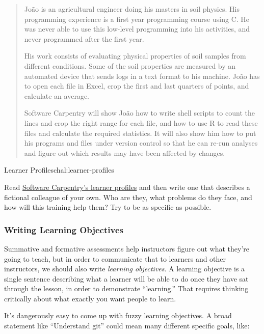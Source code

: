 \begin{quote}
João is an agricultural engineer doing his masters in soil physics. His
programming experience is a first year programming course using C. He
was never able to use this low-level programming into his activities,
and never programmed after the first year.

His work consists of evaluating physical properties of soil samples from
different conditions. Some of the soil properties are measured by an
automated device that sends logs in a text format to his machine. João
has to open each file in Excel, crop the first and last quarters of
points, and calculate an average.

Software Carpentry will show João how to write shell scripts to count
the lines and crop the right range for each file, and how to use R to
read these files and calculate the required statistics. It will also
show him how to put his programs and files under version control so that
he can re-run analyses and figure out which results may have been
affected by changes.
\end{quote}

\begin{challenge}{Learner Profiles}{chal:learner-profiles}

Read \href{\{\{\%20site.swc\_site\%20\}\}/audience/}{Software Carpentry's
learner profiles} and then write one that describes a fictional
colleague of your own. Who are they, what problems do they face, and how
will this training help them? Try to be as specific as possible.
\end{challenge}

\subsubsection{Writing Learning
Objectives}\label{writing-learning-objectives}

Summative and formative assessments help instructors figure out what
they're going to teach, but in order to communicate that to learners and
other instructors, we should also write \emph{learning objectives}. A
learning objective is a single sentence describing what a learner will
be able to do once they have sat through the lesson, in order to
demonstrate ``learning.'' That requires thinking critically about what
exactly you want people to learn.

It's dangerously easy to come up with fuzzy learning objectives. A broad
statement like ``Understand git'' could mean many different specific
goals, like:

